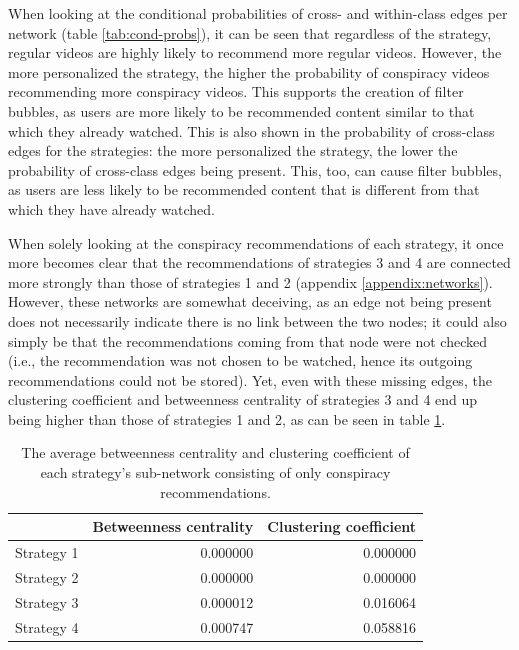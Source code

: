 \documentclass[../main.tex]{subfiles}
\begin{document}

When looking at the conditional probabilities of cross- and within-class edges per network (table 
\ref{tab:cond-probs}), it can be seen that regardless of the strategy, regular videos are highly likely to 
recommend more regular videos. However, the more personalized the strategy, the higher the probability of 
conspiracy videos recommending more conspiracy videos. This supports the creation of filter bubbles, as 
users are more likely to be recommended content similar to that which they already watched. This is also 
shown in the probability of cross-class edges for the strategies: the more personalized the strategy, the 
lower the probability of cross-class edges being present. This, too, can cause filter bubbles, as users are 
less likely to be recommended content that is different from that which they have already watched. 

When solely looking at the conspiracy recommendations of each strategy, it once more becomes clear that the 
recommendations of strategies 3 and 4 are connected more strongly than those of strategies 1 and 2 (appendix 
\ref{appendix:networks}). However, these networks are somewhat deceiving, as an edge not being present does not 
necessarily indicate there is no link between the two nodes; it could also simply be that the recommendations 
coming from that node were not checked (i.e., the recommendation was not chosen to be watched, hence its 
outgoing recommendations could not be stored). Yet, even with these missing edges, the clustering coefficient 
and betweenness centrality of strategies 3 and 4 end up being higher than those of strategies 1 and 2, as can be
seen in table \ref{tab:sub-net_metrics}. 

\begin{table}[h]
\centering
\begin{tabular}{lrr}
\toprule
{} &  Betweenness centrality &  Clustering coefficient \\
\midrule
Strategy 1 &                0.000000 &                0.000000 \\
Strategy 2 &                0.000000 &                0.000000 \\
Strategy 3 &                0.000012 &                0.016064 \\
Strategy 4 &                0.000747 &                0.058816 \\
\bottomrule
\end{tabular}
\caption{\label{tab:sub-net_metrics} The average betweenness centrality and clustering coefficient of each strategy's sub-network consisting of only conspiracy recommendations.}
\end{table}
\end{document}
